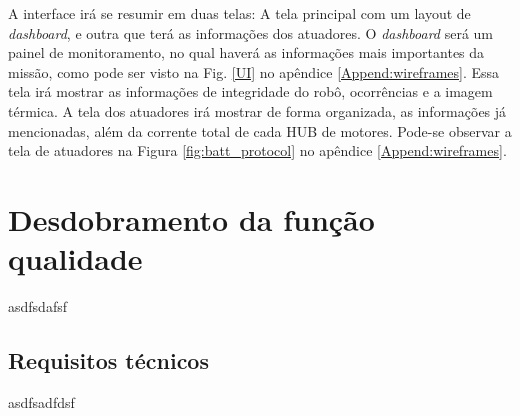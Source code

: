 A interface irá se resumir em duas telas: A tela principal com um layout de \textit{dashboard}, e outra que terá as informações dos atuadores. O \textit{dashboard} será um painel de monitoramento, no qual haverá as informações mais importantes da missão, como pode ser visto na Fig. \ref{UI} no apêndice \ref{Append:wireframes}. Essa tela irá mostrar as informações de integridade do robô, ocorrências e a imagem térmica. A tela dos atuadores irá mostrar de forma organizada, as informações já mencionadas, além da corrente total de cada HUB de motores. Pode-se observar a tela de atuadores na Figura \ref{fig:batt_protocol} no apêndice \ref{Append:wireframes}.



\section{Desdobramento da função qualidade}
\label{sec:qfd}
asdfsdafsf

\subsection{Requisitos técnicos}
\label{ssec:reqt}
asdfsadfdsf

